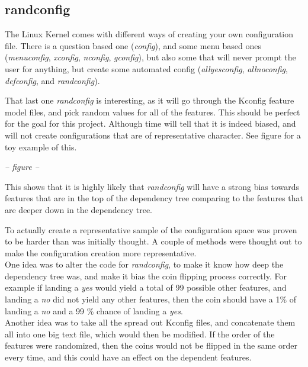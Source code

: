 \documentclass[a4paper,11pt]{article}
\begin{document}
\subsection{randconfig}

The Linux Kernel comes with different ways of creating your own configuration 
file. There is a question based one (\emph{config}), and some menu based ones 
(\emph{menuconfig}, \emph{xconfig}, \emph{nconfig}, \emph{gconfig}), but also 
some that will never prompt the user for anything, but create some automated 
config (\emph{allyesconfig}, \emph{allnoconfig}, \emph{defconfig}, and 
\emph{randconfig}).

That last one \emph{randconfig} is interesting, as it will go through the 
Kconfig feature model files, and pick random values for all of the features. 
This should be perfect for the goal for this project. Although time will tell 
that it is indeed biased, and will not create configurations that are of 
representative character. See figure for a toy example of this.


\begin{center}
    \emph{-- figure --}
\end{center}


This shows that it is highly likely that \emph{randconfig} will have a strong 
bias towards features that are in the top of the dependency tree comparing to 
the features that are deeper down in the dependency tree. 

To actually create a representative sample of the configuration space was 
proven to be harder than was initially thought. A couple of methods were 
thought out to make the configuration creation more representative. \\


One idea was to alter the code for \emph{randconfig}, to make it know how deep 
the dependency tree was, and make it bias the coin flipping process correctly. 
For example if landing a \emph{yes} would yield a total of 99 possible other 
features, and landing a \emph{no} did not yield any other features, then the 
coin should have a 1\% of landing a \emph{no} and a 99 \% chance of landing a 
\emph{yes}. \\


Another idea was to take all the spread out Kconfig files, and concatenate 
them all into one big text file, which would then be modified. If the order of 
the features were randomized, then the coins would not be flipped in the same 
order every time, and this could have an effect on the dependent features. \\
\end{document}
